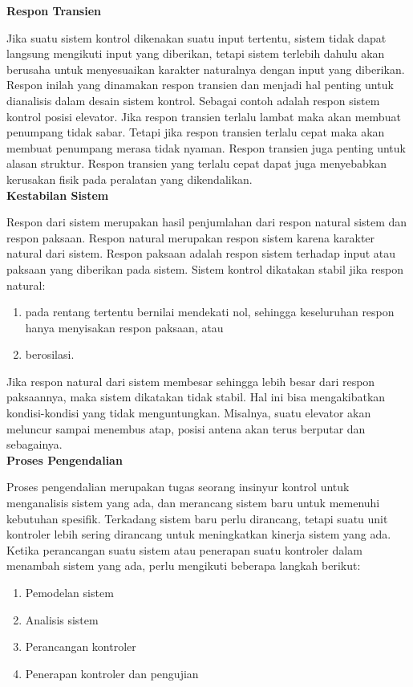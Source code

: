 \noindent \textbf{Respon Transien}

Jika suatu sistem kontrol dikenakan suatu input tertentu, sistem tidak dapat langsung mengikuti input yang diberikan, tetapi sistem terlebih dahulu akan berusaha untuk menyesuaikan karakter naturalnya dengan input yang diberikan. Respon inilah yang dinamakan respon transien dan menjadi hal penting untuk dianalisis dalam desain sistem kontrol. Sebagai contoh adalah respon sistem kontrol posisi elevator. Jika respon transien terlalu lambat maka akan membuat penumpang tidak sabar. Tetapi jika respon transien terlalu cepat maka akan membuat penumpang merasa tidak nyaman. Respon transien juga penting untuk alasan struktur. Respon transien yang terlalu cepat dapat juga menyebabkan kerusakan fisik pada peralatan yang dikendalikan.\cite{ControlSystemBook} \\

\noindent \textbf{Kestabilan Sistem}

Respon dari sistem merupakan hasil penjumlahan dari respon natural sistem dan respon paksaan. Respon natural merupakan respon sistem karena karakter natural dari sistem. Respon paksaan adalah respon sistem terhadap input atau paksaan yang diberikan pada sistem.
Sistem kontrol dikatakan stabil jika respon natural:
\begin{enumerate}
	\item pada rentang tertentu bernilai mendekati nol, sehingga keseluruhan respon hanya menyisakan respon paksaan, atau
	\item berosilasi.
\end{enumerate}

Jika respon natural dari sistem membesar sehingga lebih besar dari respon paksaannya, maka sistem dikatakan tidak stabil. Hal ini bisa mengakibatkan kondisi-kondisi yang tidak menguntungkan. Misalnya, suatu elevator akan meluncur sampai menembus atap, posisi antena akan terus berputar dan sebagainya.\\

\noindent\textbf{Proses Pengendalian}

Proses pengendalian merupakan tugas seorang insinyur kontrol untuk menganalisis sistem yang ada, dan merancang sistem baru untuk memenuhi kebutuhan spesifik. Terkadang sistem baru perlu dirancang, tetapi suatu unit kontroler lebih sering dirancang untuk meningkatkan kinerja sistem yang ada. Ketika perancangan suatu sistem atau penerapan suatu kontroler dalam menambah sistem yang ada, perlu mengikuti beberapa langkah berikut: \cite{ControlSystemBook}
\begin{enumerate}
	\item Pemodelan sistem
	\item Analisis sistem
	\item Perancangan kontroler
	\item Penerapan kontroler dan pengujian
\end{enumerate}

